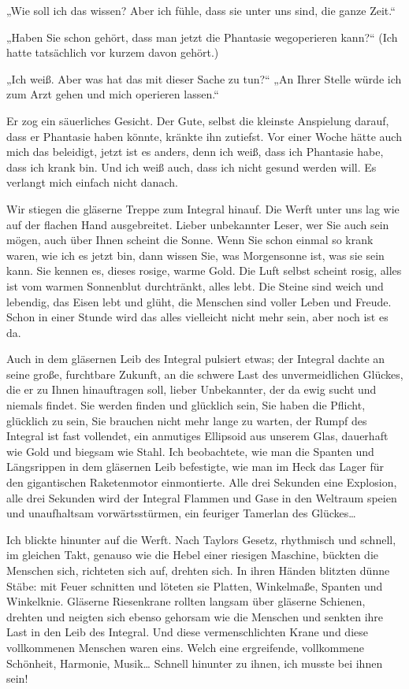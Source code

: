 „Wie soll ich das wissen? Aber ich fühle, dass sie unter uns sind,
die ganze Zeit.“

„Haben Sie schon gehört, dass man jetzt die Phantasie wegoperieren
kann?“ (Ich hatte tatsächlich vor kurzem davon gehört.)

„Ich weiß. Aber was hat das mit dieser Sache zu tun?“ „An Ihrer
Stelle würde ich zum Arzt gehen und mich operieren lassen.“

Er zog ein säuerliches Gesicht. Der Gute, selbst die kleinste
Anspielung darauf, dass er Phantasie haben könnte, kränkte ihn
zutiefst. Vor einer Woche hätte auch mich das beleidigt, jetzt ist
es anders, denn ich weiß, dass ich
Phantasie habe, dass ich krank bin. Und ich weiß auch, dass ich
nicht gesund werden will.
Es verlangt mich einfach nicht danach.

Wir stiegen die gläserne
Treppe zum Integral hinauf. Die Werft unter uns lag wie auf der
flachen Hand ausgebreitet. Lieber unbekannter Leser, wer Sie auch
sein mögen, auch über Ihnen scheint die Sonne. Wenn Sie schon
einmal so krank waren, wie ich es jetzt bin, dann wissen Sie, was
Morgensonne ist, was sie sein kann. Sie kennen es, dieses rosige,
warme Gold. Die Luft selbst scheint rosig, alles ist vom warmen
Sonnenblut durchtränkt, alles lebt. Die Steine sind weich und
lebendig, das Eisen lebt und glüht, die Menschen sind voller Leben
und Freude. Schon in einer Stunde wird das alles vielleicht nicht
mehr sein, aber noch ist es da.

Auch in dem gläsernen Leib des Integral pulsiert etwas; der
Integral dachte an seine große, furchtbare Zukunft, an die schwere
Last des unvermeidlichen Glückes, die er zu Ihnen hinauftragen
soll, lieber Unbekannter, der da ewig sucht und niemals findet. Sie
werden finden und glücklich sein, Sie haben die Pflicht, glücklich
zu sein, Sie brauchen nicht mehr lange zu warten, der Rumpf des
Integral ist fast vollendet, ein anmutiges Ellipsoid aus unserem
Glas, dauerhaft wie Gold und biegsam wie Stahl. Ich beobachtete,
wie man die Spanten und Längsrippen in dem gläsernen Leib
befestigte, wie man im Heck das Lager für den gigantischen
Raketenmotor einmontierte. Alle drei Sekunden eine Explosion, alle
drei Sekunden wird der Integral Flammen und Gase in den Weltraum
speien und unaufhaltsam vorwärtsstürmen, ein feuriger Tamerlan des
Glückes\ldots{}

Ich blickte hinunter auf die Werft. Nach Taylors Gesetz, rhythmisch
und schnell, im gleichen Takt, genauso wie die
Hebel einer riesigen Maschine, bückten die Menschen sich, richteten
sich auf, drehten sich. In ihren Händen blitzten dünne Stäbe: mit
Feuer schnitten und löteten sie Platten, Winkelmaße, Spanten und
Winkelknie. Gläserne Riesenkrane rollten langsam über gläserne
Schienen, drehten und neigten sich ebenso gehorsam wie die Menschen
und senkten ihre Last in den Leib des Integral. Und diese
vermenschlichten Krane und diese vollkommenen Menschen waren eins.
Welch eine ergreifende, vollkommene Schönheit, Harmonie, Musik\ldots{}
Schnell hinunter zu ihnen, ich musste bei ihnen sein!

